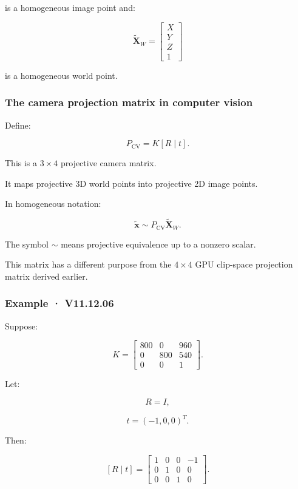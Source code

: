 is a homogeneous image point and:

\[
 \tilde{\mathbf X}_W= \begin{bmatrix}X\\Y\\Z\\1\end{bmatrix}
\]

is a homogeneous world point.

\subsubsection{The camera projection matrix in computer vision}\label{the-camera-projection-matrix-in-computer-vision}

Define:

\[
 \boxed{ P_{\mathrm{CV}}=K[R\mid t] }.
\]

This is a \(3\times4\) projective camera matrix.

It maps projective 3D world points into projective 2D image points.

In homogeneous notation:

\[
 \boxed{ \tilde{\mathbf x}\sim P_{\mathrm{CV}}\tilde{\mathbf X}_W }.
\]

The symbol \(\sim\) means projective equivalence up to a nonzero scalar.

This matrix has a different purpose from the \(4\times4\) GPU clip-space projection matrix derived earlier.

\subsubsection{Example · V11.12.06}\label{example-v11.12.06}

Suppose:

\[
 K= \begin{bmatrix} 800&0&960\\ 0&800&540\\ 0&0&1 \end{bmatrix}.
\]

Let:

\[
 R=I,
\]

\[
 t=(-1,0,0)^T.
\]

Then:

\[
 [R\mid t] = \begin{bmatrix} 1&0&0&-1\\ 0&1&0&0\\ 0&0&1&0 \end{bmatrix}.
\]

